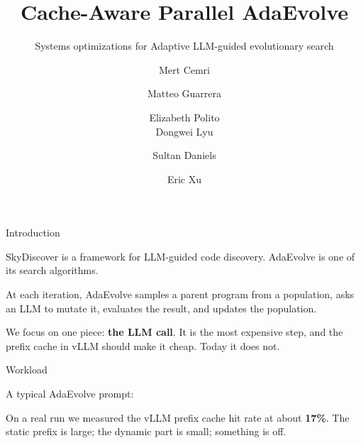 \documentclass[10pt,aspectratio=169]{beamer}
\title{Cache-Aware Parallel AdaEvolve}
\subtitle{Systems optimizations for Adaptive LLM-guided evolutionary search}
\author{
  Mert Cemri \and Matteo Guarrera \and Elizabeth Polito \\
  Dongwei Lyu \and Sultan Daniels \and Eric Xu
}
\institute{CS 294 Scalable AI Systems --- Spring 2026}
\date{}
\begin{document}
\maketitle

\begin{frame}{Introduction}

SkyDiscover is a framework for LLM-guided code discovery. AdaEvolve
is one of its search algorithms.

\vspace{0.6em}
At each iteration, AdaEvolve samples a parent program from a
population, asks an LLM to mutate it, evaluates the result, and
updates the population.

\vspace{0.6em}
We focus on one piece: \textbf{the LLM call}. It is the most
expensive step, and the prefix cache in vLLM should make it cheap.
Today it does not.

\end{frame}

\begin{frame}{Workload}

A typical AdaEvolve prompt:

\vspace{0.4em}
\begin{center}
\end{center}

\vspace{1.2em}
On a real run we measured the vLLM prefix cache hit rate at about
\textbf{17\%}. The static prefix is large; the dynamic part is small;
something is off.

\end{frame}
\end{document}
